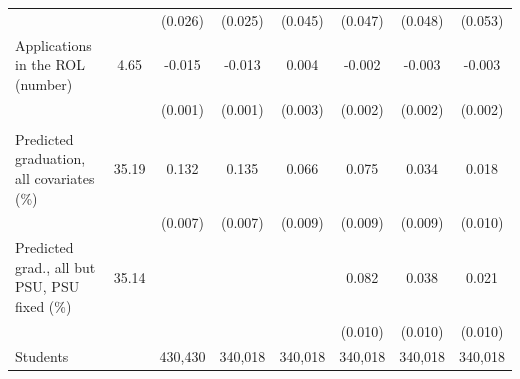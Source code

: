 \begin{tabular}{lc*{6}{c}}
 &  & (0.026) & (0.025) & (0.045) & (0.047) & (0.048) & (0.053) \\
Applications in the ROL (number) &   4.65 & -0.015\sym{***} & -0.013\sym{***} &  0.004 & -0.002 & -0.003 & -0.003\sym{**} \\
 &  & (0.001) & (0.001) & (0.003) & (0.002) & (0.002) & (0.002) \\
\addlinespace
\multicolumn{8}{l}{\textit{Joint tests}} \\
Predicted graduation, all covariates (\%) &  35.19 &  0.132\sym{***} &  0.135\sym{***} &  0.066\sym{***} &  0.075\sym{***} &  0.034\sym{***} &  0.018\sym{*} \\
 &  & (0.007) & (0.007) & (0.009) & (0.009) & (0.009) & (0.010) \\
Predicted grad., all but PSU, PSU fixed (\%) &  35.14 &  &  &  &  0.082\sym{***} &  0.038\sym{***} &  0.021\sym{**} \\
 &  &  &  &  & (0.010) & (0.010) & (0.010) \\
\midrule
Students & &   430,430 &   340,018 &   340,018 &   340,018 &   340,018 &   340,018 \\
\bottomrule
\end{tabular}
